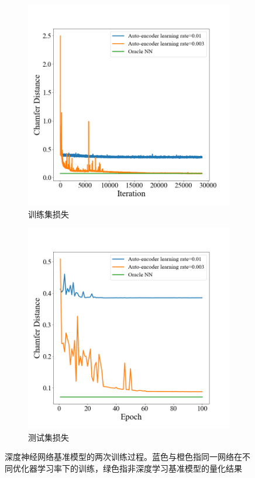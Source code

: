 \documentclass[bachelor, nocolorlinks, printoneside]{seuthesis} %
\begin{document}
\begin{Main}
\begin{figure}[!htb]
    \centering
       \begin{subfigure}[t]{0.49\linewidth} \centering 
         \includegraphics[width=\columnwidth]{figs/model/ae_trainingloss.png}
         \caption{训练集损失}\label{fig:trainingloss}
       \end{subfigure}
      \begin{subfigure}[t]{0.49\linewidth} \centering
          \includegraphics[width=\columnwidth]{figs//model/ae_testloss.png}
          \caption{测试集损失}\label{fig:testloss}
      \end{subfigure}
       \caption{\small 深度神经网络基准模型的两次训练过程。蓝色与橙色指同一网络在不同优化器学习率下的训练，绿色指非深度学习基准模型的量化结果}
    \label{fig:lossplot}
\end{figure}


\end{Main}
\end{document}
